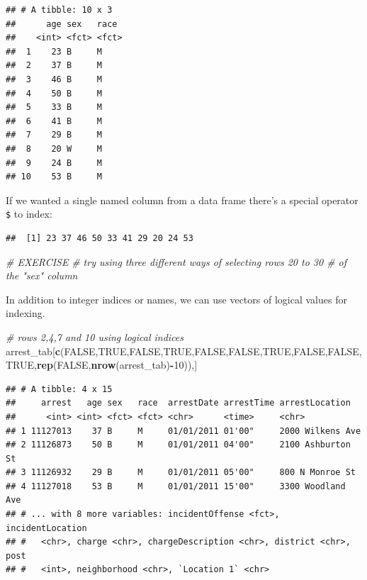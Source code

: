\documentclass[12pt,]{book}
\newenvironment{Shaded}{\begin{snugshade}}{\end{snugshade}}
\newcommand{\KeywordTok}[1]{\textcolor[rgb]{0.13,0.29,0.53}{\textbf{#1}}}
\newcommand{\DecValTok}[1]{\textcolor[rgb]{0.00,0.00,0.81}{#1}}
\newcommand{\CommentTok}[1]{\textcolor[rgb]{0.56,0.35,0.01}{\textit{#1}}}
\newcommand{\OtherTok}[1]{\textcolor[rgb]{0.56,0.35,0.01}{#1}}
\newcommand{\OperatorTok}[1]{\textcolor[rgb]{0.81,0.36,0.00}{\textbf{#1}}}
\newcommand{\NormalTok}[1]{#1}
\theoremstyle{definition}
\theoremstyle{definition}
\theoremstyle{definition}
\theoremstyle{remark}
\begin{document}
\begin{verbatim}
## # A tibble: 10 x 3
##      age sex   race 
##    <int> <fct> <fct>
##  1    23 B     M    
##  2    37 B     M    
##  3    46 B     M    
##  4    50 B     M    
##  5    33 B     M    
##  6    41 B     M    
##  7    29 B     M    
##  8    20 W     M    
##  9    24 B     M    
## 10    53 B     M
\end{verbatim}

If we wanted a single named column from a data frame there's a special
operator \texttt{\$} to index:

\begin{Shaded}
\end{Shaded}

\begin{verbatim}
##  [1] 23 37 46 50 33 41 29 20 24 53
\end{verbatim}

\begin{Shaded}
\begin{Highlighting}[]
\CommentTok{# EXERCISE}
\CommentTok{# try using three different ways of selecting rows 20 to 30 # of the "sex" column}
\end{Highlighting}
\end{Shaded}

In addition to integer indices or names, we can use vectors of logical
values for indexing.

\begin{Shaded}
\begin{Highlighting}[]
\CommentTok{# rows 2,4,7 and 10 using logical indices}
\NormalTok{arrest_tab[}\KeywordTok{c}\NormalTok{(}\OtherTok{FALSE}\NormalTok{,}\OtherTok{TRUE}\NormalTok{,}\OtherTok{FALSE}\NormalTok{,}\OtherTok{TRUE}\NormalTok{,}\OtherTok{FALSE}\NormalTok{,}\OtherTok{FALSE}\NormalTok{,}\OtherTok{TRUE}\NormalTok{,}\OtherTok{FALSE}\NormalTok{,}\OtherTok{FALSE}\NormalTok{,}\OtherTok{TRUE}\NormalTok{,}\KeywordTok{rep}\NormalTok{(}\OtherTok{FALSE}\NormalTok{,}\KeywordTok{nrow}\NormalTok{(arrest_tab)}\OperatorTok{-}\DecValTok{10}\NormalTok{)),]}
\end{Highlighting}
\end{Shaded}

\begin{verbatim}
## # A tibble: 4 x 15
##     arrest   age sex   race  arrestDate arrestTime arrestLocation   
##      <int> <int> <fct> <fct> <chr>      <time>     <chr>            
## 1 11127013    37 B     M     01/01/2011 01'00"     2000 Wilkens Ave 
## 2 11126873    50 B     M     01/01/2011 04'00"     2100 Ashburton St
## 3 11126932    29 B     M     01/01/2011 05'00"     800 N Monroe St  
## 4 11127018    53 B     M     01/01/2011 15'00"     3300 Woodland Ave
## # ... with 8 more variables: incidentOffense <fct>, incidentLocation
## #   <chr>, charge <chr>, chargeDescription <chr>, district <chr>, post
## #   <int>, neighborhood <chr>, `Location 1` <chr>
\end{verbatim}
\end{document}
